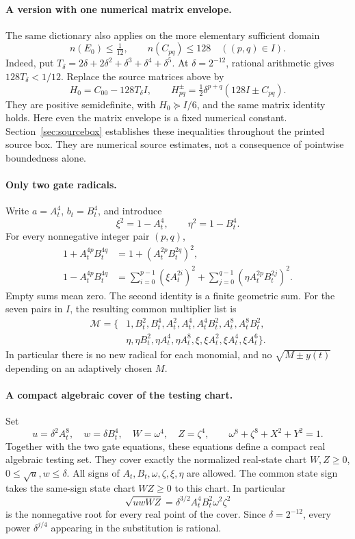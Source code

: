 \paragraph{A version with one numerical matrix envelope.}
The same dictionary also applies on the more elementary sufficient domain
\[
 n(E_0)\le\tfrac1{12},\qquad n(C_{pq})\le128\quad((p,q)\in I).
\]
Indeed, put $T_\delta=2\delta+2\delta^2+\delta^3+\delta^4+\delta^5$.
At $\delta=2^{-12}$, rational arithmetic gives
$128T_\delta<1/12$. Replace the source matrices above by
\[
 H_0=C_{00}-128T_\delta I,\qquad
 H_{pq}^{\pm}=\tfrac12\delta^{p+q}(128I\pm C_{pq}).
\]
They are positive semidefinite, with $H_0\succeq I/6$, and the
same matrix identity holds. Here even the matrix envelope is a fixed
numerical constant. Section~\ref{sec:sourcebox} establishes these inequalities throughout
the printed source box. They are numerical source estimates, not
a consequence of pointwise boundedness alone.

\paragraph{Only two gate radicals.}
Write $a=A_t^4$, $b_t=B_t^4$, and introduce
\[
 \xi^2=1-A_t^4,\qquad \eta^2=1-B_t^4.
\]
For every nonnegative integer pair $(p,q)$,
\begin{align*}
 1+A_t^{4p}B_t^{4q}&=1+(A_t^{2p}B_t^{2q})^2,\\
 1-A_t^{4p}B_t^{4q}
  &=\sum_{i=0}^{p-1}(\xi A_t^{2i})^2
    +\sum_{j=0}^{q-1}(\eta A_t^{2p}B_t^{2j})^2.
\end{align*}
Empty sums mean zero. The second identity is a finite geometric sum.
For the seven pairs in $I$, the resulting common multiplier list is
\[
\begin{split}
\mathcal M=\{&1,B_t^2,B_t^4,A_t^2,A_t^4,A_t^4B_t^2,A_t^8,A_t^8B_t^2,\\
             &\eta,\eta B_t^2,\eta A_t^4,\eta A_t^8,
               \xi,\xi A_t^2,\xi A_t^4,\xi A_t^6\}.
\end{split}
\]
In particular there is no new radical for each monomial, and no
$\sqrt{M\pm y(t)}$ depending on an adaptively chosen $M$.

\paragraph{A compact algebraic cover of the testing chart.}
Set
\[
 u=\delta^2A_t^8,\quad w=\delta B_t^4,\quad W=\omega^4,\quad Z=\zeta^4,
 \qquad \omega^8+\zeta^8+X^2+Y^2=1.
\]
Together with the two gate equations, these equations define a compact
real algebraic testing set. They cover exactly the normalized real-state
chart $W,Z\ge0$, $0\le\sqrt u,w\le\delta$. All signs of
$A_t,B_t,\omega,\zeta,\xi,\eta$ are allowed. The common state sign takes
the same-sign state chart $WZ\ge0$ to this chart. In particular
\[
 \sqrt{uwWZ}=\delta^{3/2}A_t^4B_t^2\omega^2\zeta^2
\]
is the nonnegative root for every real point of the cover. Since
$\delta=2^{-12}$, every power $\delta^{j/4}$ appearing in the
substitution is rational.

